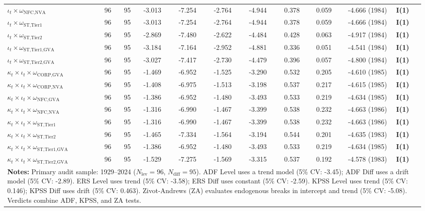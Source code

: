 \begin{table}[H]
\begin{tabular}{p{5.5cm} p{0.5cm} p{0.5cm} p{1.3cm} p{1.3cm} p{1.3cm} p{1.3cm} p{1.3cm} p{1.3cm} p{2.2cm} p{2.2cm}}
$\iota_t \times \omega_{\text{NFC,NVA}}$ & 96 & 95 & -3.013 & -7.254 & -2.764 & -4.944 & 0.378 & 0.059 & -4.666 (1984) & \textbf{I(1)} \\ 
$\iota_t \times \omega_{\text{ST,Tier1}}$ & 96 & 95 & -3.013 & -7.254 & -2.764 & -4.944 & 0.378 & 0.059 & -4.666 (1984) & \textbf{I(1)} \\ 
$\iota_t \times \omega_{\text{ST,Tier2}}$ & 96 & 95 & -2.869 & -7.480 & -2.622 & -4.484 & 0.428 & 0.063 & -4.917 (1984) & \textbf{I(1)} \\ 
$\iota_t \times \omega_{\text{ST,Tier1,GVA}}$ & 96 & 95 & -3.184 & -7.164 & -2.952 & -4.881 & 0.336 & 0.051 & -4.541 (1984) & \textbf{I(1)} \\ 
$\iota_t \times \omega_{\text{ST,Tier2,GVA}}$ & 96 & 95 & -3.027 & -7.417 & -2.730 & -4.479 & 0.396 & 0.057 & -4.800 (1984) & \textbf{I(1)} \\ 
$\kappa_t \times \iota_t \times \omega_{\text{CORP,GVA}}$ & 96 & 95 & -1.469 & -6.952 & -1.525 & -3.290 & 0.532 & 0.205 & -4.610 (1985) & \textbf{I(1)} \\ 
$\kappa_t \times \iota_t \times \omega_{\text{CORP,NVA}}$ & 96 & 95 & -1.408 & -6.975 & -1.513 & -3.198 & 0.537 & 0.217 & -4.615 (1985) & \textbf{I(1)} \\ 
$\kappa_t \times \iota_t \times \omega_{\text{NFC,GVA}}$ & 96 & 95 & -1.386 & -6.952 & -1.480 & -3.493 & 0.533 & 0.219 & -4.634 (1985) & \textbf{I(1)} \\ 
$\kappa_t \times \iota_t \times \omega_{\text{NFC,NVA}}$ & 96 & 95 & -1.316 & -6.990 & -1.467 & -3.399 & 0.538 & 0.232 & -4.663 (1986) & \textbf{I(1)} \\ 
$\kappa_t \times \iota_t \times \omega_{\text{ST,Tier1}}$ & 96 & 95 & -1.316 & -6.990 & -1.467 & -3.399 & 0.538 & 0.232 & -4.663 (1986) & \textbf{I(1)} \\ 
$\kappa_t \times \iota_t \times \omega_{\text{ST,Tier2}}$ & 96 & 95 & -1.465 & -7.334 & -1.564 & -3.194 & 0.544 & 0.201 & -4.635 (1983) & \textbf{I(1)} \\ 
$\kappa_t \times \iota_t \times \omega_{\text{ST,Tier1,GVA}}$ & 96 & 95 & -1.386 & -6.952 & -1.480 & -3.493 & 0.533 & 0.219 & -4.634 (1985) & \textbf{I(1)} \\ 
$\kappa_t \times \iota_t \times \omega_{\text{ST,Tier2,GVA}}$ & 96 & 95 & -1.529 & -7.275 & -1.569 & -3.315 & 0.537 & 0.192 & -4.578 (1983) & \textbf{I(1)} \\ 
\bottomrule
\multicolumn{11}{p{21.5cm}}{\footnotesize \textbf{Notes:} Primary audit sample: 1929--2024 ($N_{\text{lev}}=96$, $N_{\text{diff}}=95$). ADF Level uses a trend model (5\% CV: -3.45); ADF Diff uses a drift model (5\% CV: -2.89). ERS Level uses trend (5\% CV: -3.58); ERS Diff uses constant (5\% CV: -2.59). KPSS Level uses trend (5\% CV: 0.146); KPSS Diff uses drift (5\% CV: 0.463). Zivot-Andrews (ZA) evaluates endogenous breaks in intercept and trend (5\% CV: -5.08). Verdicts combine ADF, KPSS, and ZA tests.}
\end{tabular}
\end{table}
